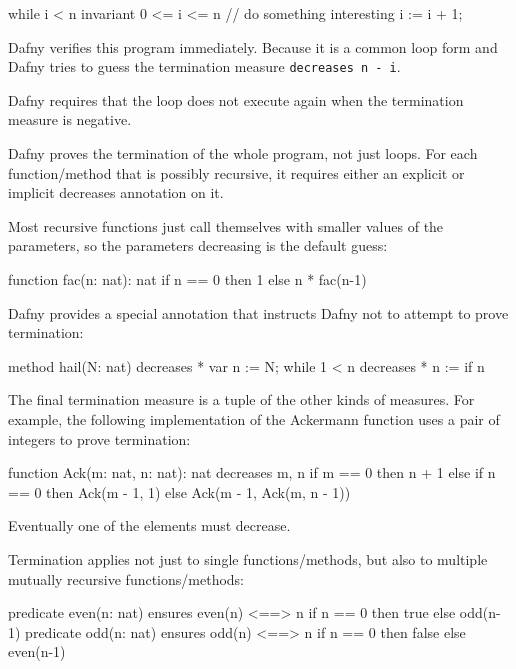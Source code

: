 \documentclass[10pt, compress]{beamer}
\begin{document}
\begin{frame}[fragile]
  \begin{verbnobox}[\footnotesize]
while i < n
   invariant 0 <= i <= n
{
   // do something interesting
   i := i + 1;
}
  \end{verbnobox}
Dafny verifies this program immediately. Because it is a common loop form and Dafny tries to guess the termination measure \verb|decreases n - i|.

Dafny requires that the loop does not execute again when the termination measure is negative. 
\end{frame}

\begin{frame}[fragile]
Dafny proves the termination of the whole program, not just loops.
For each function/method that is possibly recursive, it requires either an explicit or implicit decreases annotation on it.

Most recursive functions just call themselves with smaller values of the parameters, so the parameters decreasing is the default guess:
  \begin{verbnobox}[\footnotesize]
function fac(n: nat): nat
{
   if n == 0 then 1 else n * fac(n-1)
}
  \end{verbnobox}
\end{frame}

\begin{frame}[fragile]
Dafny provides a special annotation that instructs Dafny not to attempt to prove termination:
  \begin{verbnobox}[\footnotesize]
method hail(N: nat)
   decreases *
{
   var n := N;
   while 1 < n
      decreases *
   { 
      n := if n %
   }
}
  \end{verbnobox}
\end{frame}

\begin{frame}[fragile]
The final termination measure is a tuple of the other kinds of measures. For example, the following implementation of the Ackermann function uses a pair of integers to prove termination:
  \begin{verbnobox}[\footnotesize]
function Ack(m: nat, n: nat): nat
   decreases m, n
{
   if m == 0 then n + 1
   else if n == 0 then Ack(m - 1, 1)
   else Ack(m - 1, Ack(m, n - 1))
}
  \end{verbnobox}
Eventually one of the elements must decrease.
\end{frame}

\begin{frame}[fragile]
Termination applies not just to single functions/methods, but also to multiple mutually recursive functions/methods:
  \begin{verbnobox}[\footnotesize]
predicate even(n: nat)
   ensures even(n) <==> n %
{
   if n == 0 then true else odd(n-1)
}
predicate odd(n: nat)
   ensures odd(n) <==> n %
{
   if n == 0 then false else even(n-1)
}
  \end{verbnobox}
\end{frame}
\end{document}
